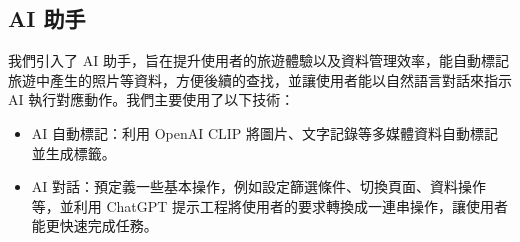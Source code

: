 \subsection{AI 助手}

我們引入了 AI 助手，旨在提升使用者的旅遊體驗以及資料管理效率，能自動標記旅遊中產生的照片等資料，方便後續的查找，並讓使用者能以自然語言對話來指示 AI 執行對應動作。我們主要使用了以下技術：

\begin{itemize}
    \item AI 自動標記：利用 OpenAI CLIP 將圖片、文字記錄等多媒體資料自動標記並生成標籤。
    \item AI 對話：預定義一些基本操作，例如設定篩選條件、切換頁面、資料操作等，並利用 ChatGPT 提示工程將使用者的要求轉換成一連串操作，讓使用者能更快速完成任務。
\end{itemize}